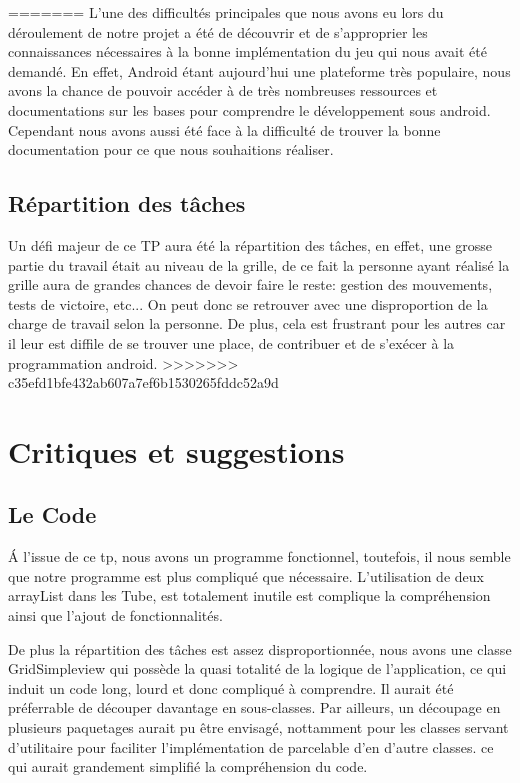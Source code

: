 \documentclass[12pt, a4paper]{article}%
\begin{document}
 
=======
L'une des difficultés principales que nous avons eu lors du déroulement de notre projet a été de découvrir et de s'approprier les connaissances nécessaires à la bonne implémentation du jeu qui nous avait été demandé. En effet, Android étant aujourd'hui une plateforme très populaire, nous avons la chance de pouvoir accéder à de très nombreuses ressources et documentations sur les bases pour comprendre le développement sous android. Cependant nous avons aussi été face à la difficulté de trouver la bonne documentation pour ce que nous souhaitions réaliser. 
  \subsection{Répartition des tâches}
  Un défi majeur de ce TP aura été la répartition des tâches, en effet, une grosse partie du travail était au niveau de la grille,
  de ce fait la personne ayant réalisé la grille aura de grandes chances de devoir faire le reste: gestion des mouvements, tests
  de victoire, etc...
  On peut donc se retrouver avec une disproportion de la charge de travail selon la personne. De plus, cela est frustrant pour les
  autres car il leur est diffile de se trouver une place, de contribuer et de s'exécer à la programmation android.
>>>>>>> c35efd1bfe432ab607a7ef6b1530265fddc52a9d
\section{Critiques et suggestions}
  \subsection{Le Code}
  \'A l'issue de ce tp, nous avons un programme fonctionnel, toutefois, il nous semble que notre programme est plus compliqué que
  nécessaire. L'utilisation de deux arrayList dans les Tube, est totalement inutile est complique la compréhension ainsi que
  l'ajout de fonctionnalités.
  \newline

  De plus la répartition des tâches est assez disproportionnée, nous avons une classe GridSimpleview qui possède la quasi totalité
  de la logique de l'application, ce qui induit un code long, lourd et donc compliqué à comprendre. Il aurait été préferrable de
  découper davantage en sous-classes. Par ailleurs, un découpage en plusieurs paquetages aurait pu être envisagé, nottamment pour
  les classes servant d'utilitaire pour faciliter l'implémentation de parcelable d'en d'autre classes. ce qui aurait grandement
  simplifié la compréhension du code.
\end{document}
